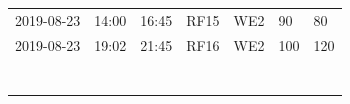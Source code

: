 \documentclass[draft]{agujournal2019}
\begin{document}
\begin{table}
\begin{tabular}{lllllll}
2019-08-23 & 14:00            & 16:45          & RF15                                                    & WE2                                                     & 90                                                      & 80                                                       \\
2019-08-23 & 19:02            & 21:45          & RF16                                                    & WE2                                                     & 100                                                     & 120                                                      \\
           &                  &                &                                                         &                                                         &                                                         &                                                          \\
           &                  &                &                                                         &                                                         &                                                         &                                                          \\
           &                  &                &                                                         &                                                         &                                                         &                                                          \\
           &                  &                &                                                         &                                                         &                                                         &                                                          \\
           &                  &                &                                                         &                                                         &                                                         &                                                          \\
           &                  &                &                                                         &                                                         &                                                         &                                                          \\
           &                  &                &                                                         &                                                         &                                                         &                                                         
\end{tabular}
\label{table:1}
\end{table}
\end{document}
